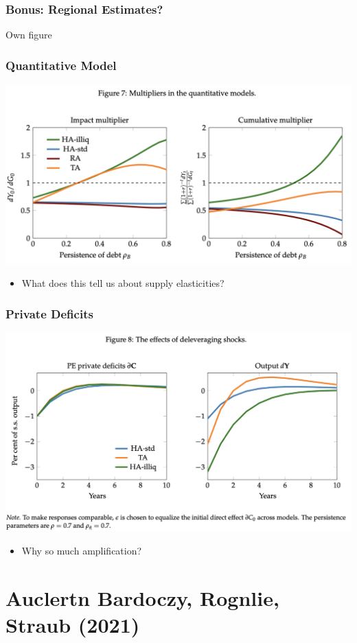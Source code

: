 \documentclass[english,xcolor=svgnames]{beamer}
\begin{document}
\begin{frame}
    \frametitle{Bonus: Regional Estimates?}
    Own figure
\end{frame}


\begin{frame}
    \frametitle{Quantitative Model}
    \includegraphics[scale=0.5]{figures/ARSFIG7.png}
    \begin{itemize}
    	\item What does this tell us about supply elasticities?
    \end{itemize}
\end{frame}

\begin{frame}
    \frametitle{Private Deficits}
    \includegraphics[scale=0.5]{figures/ARSFIG8.png}
    \begin{itemize}
    	\item Why so much amplification?
    \end{itemize}
\end{frame}

\section{Auclertn Bardoczy, Rognlie, Straub (2021)}
\end{document}
